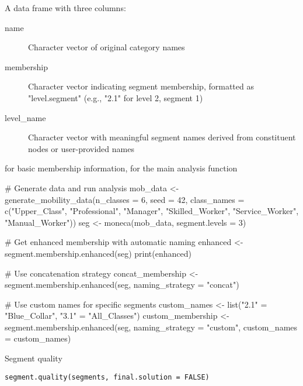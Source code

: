 \documentclass[a4paper]{book}
\begin{document}
%
\begin{Value}
A data frame with three columns:
\begin{description}

\item[name] Character vector of original category names
\item[membership] Character vector indicating segment membership, formatted
as "level.segment" (e.g., "2.1" for level 2, segment 1)
\item[level\_name] Character vector with meaningful segment names derived
from constituent nodes or user-provided names

\end{description}

\end{Value}
%
\begin{SeeAlso}
 for basic membership information,
 for the main analysis function
\end{SeeAlso}
%
\begin{Examples}
\begin{ExampleCode}
# Generate data and run analysis
mob_data <- generate_mobility_data(n_classes = 6, seed = 42,
  class_names = c("Upper_Class", "Professional", "Manager", 
                  "Skilled_Worker", "Service_Worker", "Manual_Worker"))
seg <- moneca(mob_data, segment.levels = 3)

# Get enhanced membership with automatic naming
enhanced <- segment.membership.enhanced(seg)
print(enhanced)

# Use concatenation strategy
concat_membership <- segment.membership.enhanced(seg, 
                                                naming_strategy = "concat")

# Use custom names for specific segments
custom_names <- list("2.1" = "Blue_Collar", "3.1" = "All_Classes")
custom_membership <- segment.membership.enhanced(seg, 
                                                naming_strategy = "custom",
                                                custom_names = custom_names)

\end{ExampleCode}
\end{Examples}
%
\begin{Description}
Segment quality
\end{Description}
%
\begin{Usage}
\begin{verbatim}
segment.quality(segments, final.solution = FALSE)
\end{verbatim}
\end{Usage}
\end{document}
